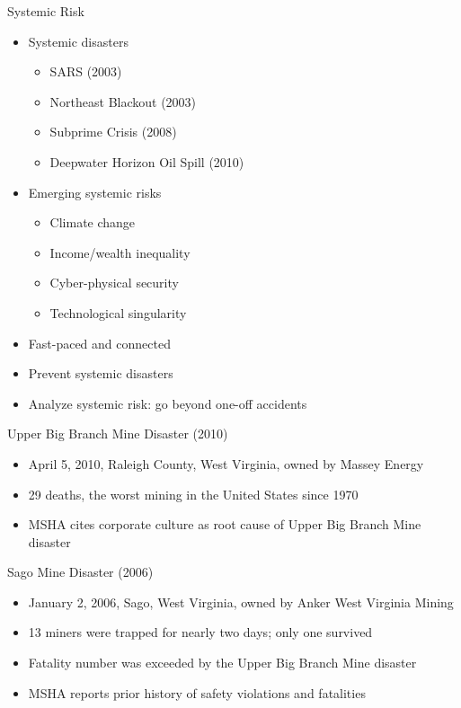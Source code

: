 \documentclass[
]{beamer}
\providecommand{\tightlist}{%
  \setlength{\itemsep}{0pt}\setlength{\parskip}{0pt}}
\begin{document}
\begin{frame}{Systemic Risk}

\begin{itemize}
\tightlist
\item
  Systemic disasters

  \begin{itemize}
  \tightlist
  \item
    SARS (2003)
  \item
    Northeast Blackout (2003)
  \item
    Subprime Crisis (2008)
  \item
    Deepwater Horizon Oil Spill (2010)
  \end{itemize}
\item
  Emerging systemic risks

  \begin{itemize}
  \tightlist
  \item
    Climate change
  \item
    Income/wealth inequality
  \item
    Cyber-physical security
  \item
    Technological singularity
  \end{itemize}
\item
  Fast-paced and connected
\item
  Prevent systemic disasters
\item
  Analyze systemic risk: go beyond one-off accidents
\end{itemize}

\end{frame}

\begin{frame}{Upper Big Branch Mine Disaster (2010)}

\begin{itemize}
\tightlist
\item
  April 5, 2010, Raleigh County, West Virginia, owned by Massey Energy
\item
  29 deaths, the worst mining in the United States since 1970
\item
  MSHA cites corporate culture as root cause of Upper Big Branch Mine
  disaster
\end{itemize}

\end{frame}

\begin{frame}{Sago Mine Disaster (2006)}

\begin{itemize}
\tightlist
\item
  January 2, 2006, Sago, West Virginia, owned by Anker West Virginia
  Mining
\item
  13 miners were trapped for nearly two days; only one survived
\item
  Fatality number was exceeded by the Upper Big Branch Mine disaster
\item
  MSHA reports prior history of safety violations and fatalities
\end{itemize}

\end{frame}
\end{document}
